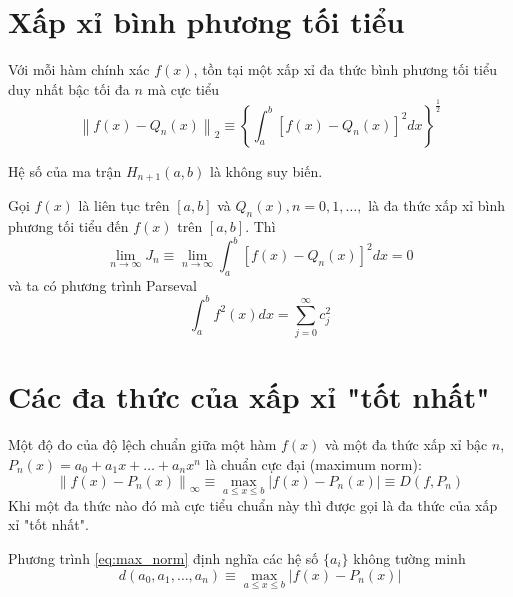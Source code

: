 \section{Xấp xỉ bình phương tối tiểu}

\begin{theorem}
    Với mỗi hàm chính xác $f(x)$, tồn tại một xấp xỉ đa thức bình phương tối tiểu duy nhất bậc tối đa $n$ mà cực tiểu
    \begin{equation}
        \left \| f(x) - Q_n(x) \right \|_2 \equiv \left\{\int_a^b[f(x) - Q_n(x)]^2dx\right\}^{\frac{1}{2}}
    \end{equation}
\end{theorem}

\begin{theorem}
    Hệ số của ma trận $H_{n+1}(a,b)$ là không suy biến.
\end{theorem}

\begin{theorem}
    Gọi $f(x)$ là liên tục trên $[a, b]$ và $Q_n(x), n=0,1,\dots,$ là đa thức xấp xỉ bình phương tối tiểu đến $f(x)$ trên $[a,b]$. Thì
    \begin{equation}
        \lim_{n \rightarrow \infty}J_n \equiv \lim_{n \rightarrow \infty}\int_a^b[f(x) - Q_n(x)]^2dx = 0
    \end{equation}
    và ta có phương trình Parseval
    \begin{equation}
        \int_a^bf^2(x)dx = \sum_{j =0}^{\infty}c_j^2
    \end{equation}
\end{theorem}

\section{Các đa thức của xấp xỉ "tốt nhất"}

Một độ đo của độ lệch chuẩn giữa một hàm $f(x)$ và một đa thức xấp xỉ bậc $n$, $P_n(x) = a_0 + a_1x + \dots + a_nx^n$ là chuẩn cực đại (maximum norm):
\begin{equation}
    \label{eq:max_norm}
    \left \| f(x) - P_n(x) \right \|_{\infty}  \equiv \underset{a\leq x\leq b}{\max}\left | f(x) - P_n(x) \right | \equiv D(f, P_n)
\end{equation}
Khi một đa thức nào đó mà cực tiểu chuẩn này thì được gọi là đa thức của xấp xỉ "tốt nhất".

Phương trình \eqref{eq:max_norm} định nghĩa các hệ số $\{a_i\}$ không tường minh
\begin{equation}
    d(a_0, a_1, \dots, a_n) \equiv \underset{a\leq x\leq b}{\max}\left | f(x) - P_n(x) \right |
\end{equation}


